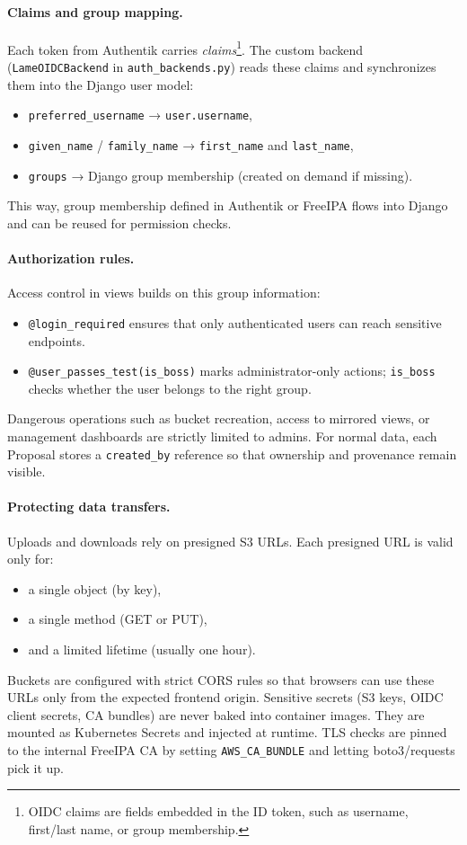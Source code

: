 \paragraph{Claims and group mapping.}
Each token from Authentik carries \emph{claims}\footnote{OIDC claims are 
	fields embedded in the ID token, such as username, first/last name, or group 
	membership.}. The custom backend (\texttt{LameOIDCBackend} in 
\texttt{auth\_backends.py}) reads these claims and synchronizes them into the 
Django user model:
\begin{itemize}
	\item \texttt{preferred\_username} → \texttt{user.username},  
	\item \texttt{given\_name} / \texttt{family\_name} → \texttt{first\_name} and \texttt{last\_name},  
	\item \texttt{groups} → Django group membership (created on demand if missing).  
\end{itemize}
This way, group membership defined in Authentik or FreeIPA flows into Django 
and can be reused for permission checks.

\paragraph{Authorization rules.}
Access control in views builds on this group information:
\begin{itemize}
	\item \texttt{@login\_required} ensures that only authenticated users 
	can reach sensitive endpoints.  
	\item \texttt{@user\_passes\_test(is\_boss)} marks administrator-only 
	actions; \texttt{is\_boss} checks whether the user belongs to the right group.  
\end{itemize}
Dangerous operations such as bucket recreation, access to mirrored views, 
or management dashboards are strictly limited to admins.  
For normal data, each Proposal stores a \texttt{created\_by} reference 
so that ownership and provenance remain visible.

\paragraph{Protecting data transfers.}
Uploads and downloads rely on presigned S3 URLs.  
Each presigned URL is valid only for:
\begin{itemize}
	\item a single object (by key),  
	\item a single method (GET or PUT),  
	\item and a limited lifetime (usually one hour).  
\end{itemize}
Buckets are configured with strict CORS rules so that browsers can use these 
URLs only from the expected frontend origin.  
Sensitive secrets (S3 keys, OIDC client secrets, CA bundles) are never baked 
into container images. They are mounted as Kubernetes Secrets and injected at 
runtime. TLS checks are pinned to the internal FreeIPA CA by setting 
\texttt{AWS\_CA\_BUNDLE} and letting boto3/requests pick it up.

